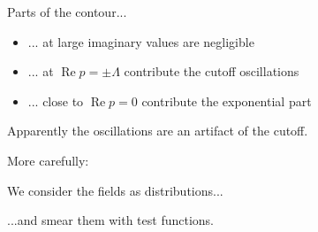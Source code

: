 \documentclass[aspectratio=169]{beamer}
\renewcommand\Re{\operatorname{Re}}
\begin{document}
\begin{frame}
Parts of the contour...

\pause
\begin{itemize}
\item \alert<2>{... at large imaginary values are negligible}


\pause
\item \alert<3>{... at $\Re p = \pm \Lambda$ contribute the cutoff oscillations}


\pause
\item \alert<4>{... close to $\Re p = 0$ contribute the exponential part}


\end{itemize}
\end{frame}


\begin{frame}
Apparently the oscillations are an \alert{artifact of the cutoff}.

\bigskip
\pause
More carefully:

\pause
\medskip
We consider the fields as \alert{distributions}...

\pause
...and \alert{smear} them with test functions.
\end{frame}
\end{document}
